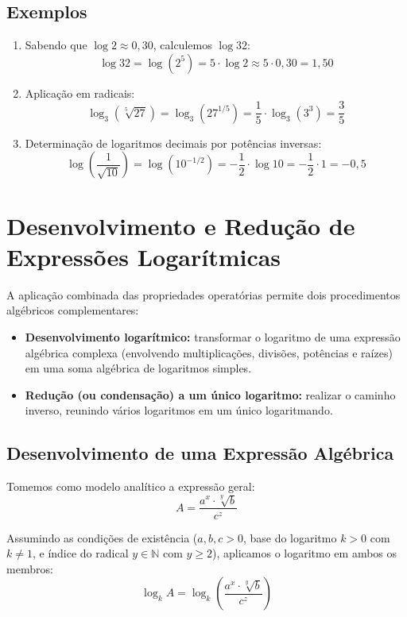 \documentclass[12pt,a4paper]{report}
\begin{document}
	\subsection*{Exemplos}
	
	\begin{enumerate}[label=\textbf{\alph*)}]
		\item Sabendo que $\log 2 \approx 0{,}30$, calculemos $\log 32$:
		$$\log 32 = \log(2^5) = 5 \cdot \log 2 \approx 5 \cdot 0{,}30 = 1{,}50$$
		
		\item Aplicação em radicais:
		$$\log_3 (\sqrt[5]{27}) = \log_3 \left(27^{1/5}\right) = \frac{1}{5} \cdot \log_3 (3^3) = \frac{3}{5}$$
		
		\item Determinação de logaritmos decimais por potências inversas:
		$$\log \left(\frac{1}{\sqrt{10}}\right) = \log\left(10^{-1/2}\right) = -\frac{1}{2} \cdot \log 10 = -\frac{1}{2} \cdot 1 = -0{,}5$$
	\end{enumerate}
	
	\section{Desenvolvimento e Redução de Expressões Logarítmicas}
	
	A aplicação combinada das propriedades operatórias permite dois procedimentos algébricos complementares:
	\begin{itemize}[label=$\circ$]
		\item \textbf{Desenvolvimento logarítmico:} transformar o logaritmo de uma expressão algébrica complexa (envolvendo multiplicações, divisões, potências e raízes) em uma soma algébrica de logaritmos simples.
		\item \textbf{Redução (ou condensação) a um único logaritmo:} realizar o caminho inverso, reunindo vários logaritmos em um único logaritmando.
	\end{itemize}
	
	\subsection{Desenvolvimento de uma Expressão Algébrica}
	
	Tomemos como modelo analítico a expressão geral:
	$$A = \frac{a^x \cdot \sqrt[y]{b}}{c^z}$$
	
	Assumindo as condições de existência ($a, b, c > 0$, base do logaritmo $k > 0$ com $k \neq 1$, e índice do radical $y \in \mathbb{N}$ com $y \geqslant 2$), aplicamos o logaritmo em ambos os membros:
	$$\log_k A = \log_k \left( \frac{a^x \cdot \sqrt[y]{b}}{c^z} \right)$$
	
\end{document}
